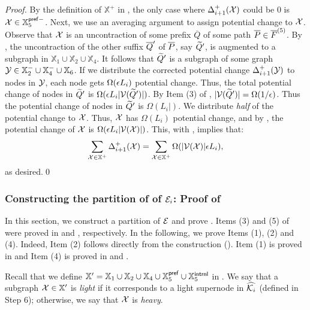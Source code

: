 \begin{proof}
By the definition of $\mathbb{X}^{+}$ in , the only case where $\Delta^+_{i+1}(\mathcal{X})$ could be $0$ is $\mathcal{X} \in  \mathbb{X}_5^{\mathsf{pref}-}$.  Next, we  use an averaging argument to assign potential change to $\mathcal{X}$. Observe that $\mathcal{X}$ is an uncontraction of some prefix $\overline{Q}$ of some path $\overline{P} \in \overline{F}^{(5)}$. By , the uncontraction of the other suffix  $\overline{Q}'$ of $\overline{P}$, say $\widetilde{Q}'$, is augmented to a subgraph in $\mathbb{X}_1\cup  \mathbb{X}_2\cup  \mathbb{X}_4$. It follows that $\widetilde{Q}'$ is a subgraph of some graph $\mathcal{Y} \in \mathbb{X}^{-}_2\cup \mathbb{X}^{-}_4 \cup \mathbb{X}_6$.  If we distribute the corrected potential change $\Delta^+_{i+1}(\mathcal{Y})$ to nodes in $\mathcal{Y}$, each node gets $\Omega(\epsilon L_i)$ potential change. Thus, the total potential change of nodes in $\widetilde{Q}'$  is $\Omega(\epsilon L_i|\mathcal{V}(\widetilde{Q}')|)$. By Item (3) of , $|\mathcal{V}(\widetilde{Q}')| = \Omega(1/\epsilon)$. Thus the potential change of nodes in $\widetilde{Q}'$  is $\Omega( L_i|)$. We distribute \emph{half} of the potential change to $\mathcal{X}$. Thus,  $\mathcal{X}$ has $\Omega(L_i)$ potential change, and by , the potential change of $\mathcal{X}$ is $\Omega(\epsilon L_i |\mathcal{V}(\mathcal{X})|)$. This, with , implies that:
	\begin{equation*}
	\sum_{\mathcal{X} \in \mathbb{X}^{+}} \Delta_{i+1}^+(\mathcal{X}) = \sum_{\mathcal{X} \in\mathbb{X}^{+}} \Omega(|\mathcal{V}(\mathcal{X})|\epsilon L_i), 
\end{equation*}
as desired.\qed
\end{proof}

\subsubsection{Constructing the partition of of $\mathcal{E}_i$: Proof of }\label{subsec:E-T2}

In this section, we construct a partition of $\mathcal{E}$ and prove . Items (3) and (5) of  were proved in  and , respectively. In the following, we prove Items (1), (2) and (4). Indeed, Item (2) follows directly from the construction (). Item (1) is proved in  and Item (4) is proved in  and . 

Recall that we define $\mathbb{X}' = \mathbb{X}_1\cup \mathbb{X}_2\cup \mathbb{X}_4\cup \mathbb{X}^{\mathsf{pref}}_5 \cup \mathbb{X}^{\mathsf{intrnl}}_5$ in . We say that a subgraph $\mathcal{X}\in \mathbb{X}'$ is \emph{light} if it corresponds to a light supernode in $\widehat{\mathcal{K}_i}$ (defined in Step 6); otherwise, we say that $\mathcal{X}$ is \emph{heavy}.

